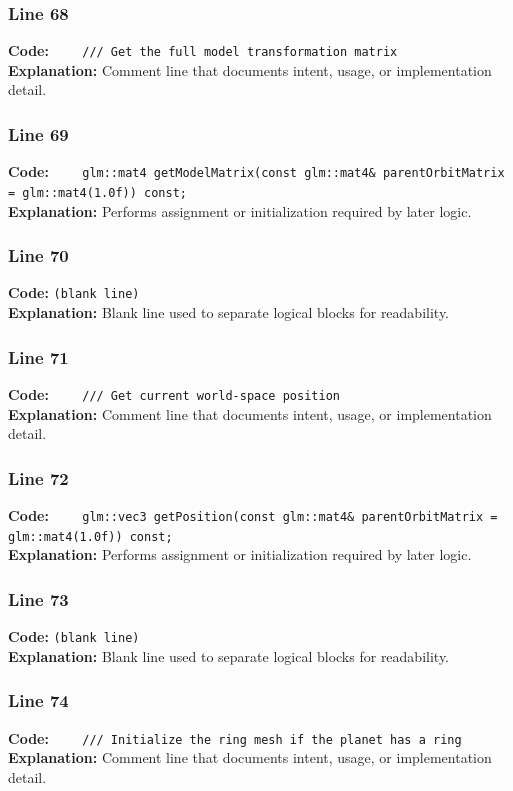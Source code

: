 \documentclass[11pt,a4paper]{article}
\begin{document}
\subsubsection*{Line 68}
\textbf{Code:} \verb|    /// Get the full model transformation matrix|\\
\textbf{Explanation:} Comment line that documents intent, usage, or implementation detail.

\subsubsection*{Line 69}
\textbf{Code:} \verb|    glm::mat4 getModelMatrix(const glm::mat4& parentOrbitMatrix = glm::mat4(1.0f)) const;|\\
\textbf{Explanation:} Performs assignment or initialization required by later logic.

\subsubsection*{Line 70}
\textbf{Code:} \texttt{(blank line)}\\
\textbf{Explanation:} Blank line used to separate logical blocks for readability.

\subsubsection*{Line 71}
\textbf{Code:} \verb|    /// Get current world-space position|\\
\textbf{Explanation:} Comment line that documents intent, usage, or implementation detail.

\subsubsection*{Line 72}
\textbf{Code:} \verb|    glm::vec3 getPosition(const glm::mat4& parentOrbitMatrix = glm::mat4(1.0f)) const;|\\
\textbf{Explanation:} Performs assignment or initialization required by later logic.

\subsubsection*{Line 73}
\textbf{Code:} \texttt{(blank line)}\\
\textbf{Explanation:} Blank line used to separate logical blocks for readability.

\subsubsection*{Line 74}
\textbf{Code:} \verb|    /// Initialize the ring mesh if the planet has a ring|\\
\textbf{Explanation:} Comment line that documents intent, usage, or implementation detail.
\end{document}
